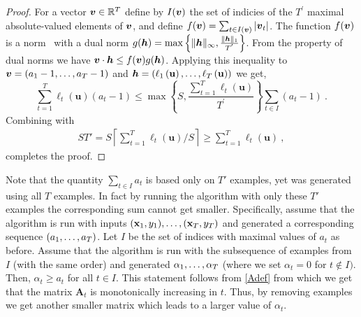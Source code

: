 \begin{proof}
For a vector ${\boldsymbol{v}}\in\mathbb{R}^T$ define by $I({\boldsymbol{v}})$ the set of indicies
of the $T^{'}$ maximal absolute-valued elements of ${\boldsymbol{v}}$, and define $f({\boldsymbol{v}}) = \sum_{t \in
  I({\boldsymbol{v}})} \vert {\boldsymbol{v}}_{t} \vert$. The function $f({\boldsymbol{v}})$ is a
norm~\citep{DekelLoSi07} with a dual norm $g({\boldsymbol{h}}) = \max\left\{ \Vert {\boldsymbol{h}}
\Vert_\infty,\frac{\Vert {\boldsymbol{h}} \Vert_1}{T^{'}}\right\}$.
From the property of dual norms we have ${\boldsymbol{v}}\cdot{\boldsymbol{h}} \leq f({\boldsymbol{v}})
g({\boldsymbol{h}})$. Applying this inequality to ${\boldsymbol{v}} = (a_1-1 , \ldots , a_T-1)$ and
${\boldsymbol{h}}=(\ell_1\left(\mathbf{u}\right) , \ldots , \ell_T\left(\mathbf{u}\right))$ we get,
\[
\sum_{t=1}^{T} \ell_t \left(\mathbf{u}\right) (a_t-1) \leq \max\left\{
  S,\frac{\sum_{t=1}^{T}\ell_{t}\left(\mathbf{u}\right)}{T^{'}}\right\} \sum_{t \in I}
(a_t-1)~.
\]
Combining with
\begin{align*}
ST' = S \left\lceil      \sum_{t=1}^{T}\ell_{t}\left(\mathbf{u}\right)/S\right\rceil
\geq
  \sum_{t=1}^{T}\ell_{t}\left(\mathbf{u}\right)~,
\end{align*}
completes the proof.
\QED
\end{proof}

Note that the quantity $\sum_{t \in I} a_t$ is based only on $T'$
examples, yet was generated using all $T$ examples. In fact by running
the algorithm with only these $T'$ examples the corresponding sum cannot get smaller. Specifically, assume that the algorithm is run with inputs
$(\mathbf{x}_{1},y_{1}) , \ldots ,  (\mathbf{x}_{T},y_{T})$ and generated a corresponding
sequence $(a_1 , \ldots ,  a_T)$. Let $I$ be the set of indices with maximal
values of $a_t$ as before. Assume that the algorithm is run with the subsequence of examples from $I$ (with the same order) and generated $\alpha_1 , \ldots ,  \alpha_T$ (where we set $\alpha_t=0$ for $t\notin I)$. Then, $\alpha_t \geq a_t$ for all $t\in I$.
This statement follows from \eqref{Adef} from which we get that the
matrix $\mathbf{A}_t$ is monotonically increasing in $t$. Thus, by removing
examples we get another smaller matrix which leads to a
larger value of $\alpha_t$.


